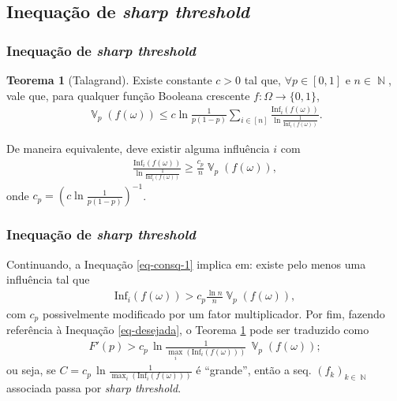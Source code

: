 \documentclass[12pt]{beamer}
\theoremstyle{definition} %
\newtheorem{mythm}{Teorema}
\DeclareMathOperator{\VX}{\mathbb{V}} %
\DeclareMathOperator{\NX}{\mathbb{N}} %
\newcommand{\infl}{\text{Inf}_i(f(\omega))}
\begin{document}
	
	\subsection{Inequação de \textit{sharp threshold}}
	\begin{frame}[t]
		\frametitle{Inequação de \textit{sharp threshold}}
		\begin{mythm}[Talagrand]
			Existe constante $c > 0$ tal que, $\forall p \in [0,1]$ e $n \in \NX$, vale que, para qualquer função Booleana crescente $f: \Omega \longrightarrow \{0,1\}$,
			\begin{align*}
				\VX_p(f(\omega)) \leq c \ln\frac{1}{p(1-p)} \sum_{i \in [n]} \frac{\infl}{\ln\frac{1}{\infl}}.
			\end{align*}
			\label{talagrand}
		\end{mythm}
		\pause
		\vspace{-8pt}
		De maneira equivalente, deve existir alguma influência $i$ com
		\begin{align} \label{eq-consq-1}
			\frac{\infl}{\ln\frac{1}{\infl}} \geq \frac{c_p}{n} \VX_p(f(\omega)),
		\end{align}
		onde $c_p = \left(c \ln \frac{1}{p(1-p)}\right)^{-1}$.
	\end{frame}
	
	\begin{frame}[t]
		\frametitle{Inequação de \textit{sharp threshold}}
		\vspace{-8pt}
		Continuando, a Inequação \ref{eq-consq-1} implica em: existe pelo menos uma influência tal que
		\begin{align*}
			\infl > c_p \frac{\ln n}{n} \VX_p(f(\omega)),
		\end{align*}
		com $c_p$ possivelmente modificado por um fator multiplicador.\vspace{12pt}
		\pause
		Por fim, fazendo referência à Inequação \ref{eq-desejada}, o Teorema \ref{talagrand} pode ser traduzido como
		\begin{align*}
			F'(p) > c_p \, \ln\frac{1}{\max_i(\infl)} \, \VX_p(f(\omega));
		\end{align*}
		ou seja, se $C = c_p \, \ln\frac{1}{\max_i(\infl)}$ é ``grande'', então a seq. $(f_k)_{k \in \NX}$ associada passa por \textit{sharp threshold}.
	\end{frame}
\end{document}
